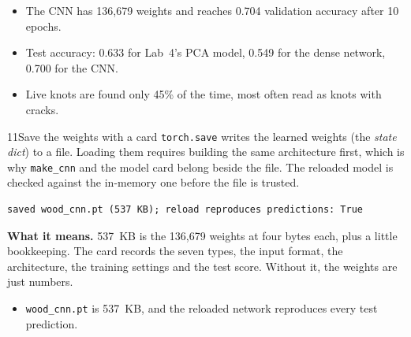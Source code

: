 \begin{labcheckpoint}
\begin{itemize}[leftmargin=1.2em,itemsep=2pt,topsep=1pt]
  \item The CNN has 136,679 weights and reaches 0.704 validation accuracy after 10 epochs.
  \item Test accuracy: 0.633 for Lab~4's PCA model, 0.549 for the dense network, 0.700 for the CNN.
  \item Live knots are found only 45\% of the time, most often read as knots with cracks.
\end{itemize}
\end{labcheckpoint}


\begin{labquestion}{11}{Save the weights with a card}
\texttt{torch.save} writes the learned weights (the \emph{state dict}) to a file. Loading them requires building the same architecture first, which is why \texttt{make\_cnn} and the model card belong beside the file. The reloaded model is checked against the in-memory one before the file is trusted.
\end{labquestion}
\begin{labanswer}

\begin{refoutput}
\begin{lstlisting}[style=utpterminal]
saved wood_cnn.pt (537 KB); reload reproduces predictions: True
\end{lstlisting}
\end{refoutput}

\textbf{What it means.} 537~KB is the 136,679 weights at four bytes each, plus a little bookkeeping. The card records the seven types, the input format, the architecture, the training settings and the test score. Without it, the weights are just numbers.
\end{labanswer}

\begin{labcheckpoint}
\begin{itemize}[leftmargin=1.2em,itemsep=2pt,topsep=1pt]
  \item \texttt{wood\_cnn.pt} is 537~KB, and the reloaded network reproduces every test prediction.
\end{itemize}
\end{labcheckpoint}

